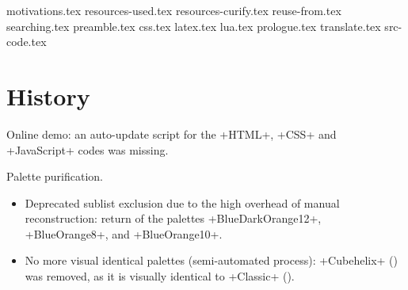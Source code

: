 \documentclass{tutodoc}
\begin{document}
\newpage
\tableofcontents
\newpage


{motivations.tex}
{resources-used.tex}
{resources-curify.tex}
{reuse-from.tex}
{searching.tex}
{preamble.tex}
{css.tex}
{latex.tex}
{lua.tex}
{prologue.tex}
{translate.tex}
{src-code.tex}


\newpage
\section{History}

\small

\begin{tdocfix}[version = 2.1.0, date = 2026-03-14]
    \item Online demo: an auto-update script for the +HTML+, +CSS+ and +JavaScript+ codes was missing.
\end{tdocfix}




\begin{tdocbreak}
    \item Palette purification.
    \begin{itemize}
        \item Deprecated sublist exclusion due to the high overhead of manual reconstruction:
        return of the palettes +BlueDarkOrange12+, +BlueOrange8+, and +BlueOrange10+.


        \item No more visual identical palettes (semi-automated process):
        +Cubehelix+ (\matplotlib) was removed, as it is visually identical to +Classic+ (\cubehelix).
    \end{itemize}
\end{tdocbreak}
\end{document}
